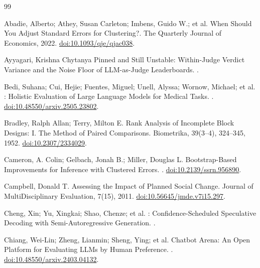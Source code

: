 \begin{thebibliography}{99}
\small

Abadie, Alberto; Athey, Susan Carleton; Imbens, Guido W.; et al.
\newblock When Should You Adjust Standard Errors for Clustering?.
\newblock The Quarterly Journal of Economics, 2022. \href{https://doi.org/10.1093/qje/qjac038}{doi:10.1093/qje/qjac038}.

Ayyagari, Krishna Chytanya
\newblock Pinned and Still Unstable: Within-Judge Verdict Variance and the Noise Floor of {LLM}-as-Judge Leaderboards.
.

Bedi, Suhana; Cui, Hejie; Fuentes, Miguel; Unell, Alyssa; Wornow, Michael; et al.
: Holistic Evaluation of Large Language Models for Medical Tasks.
. \href{https://doi.org/10.48550/arxiv.2505.23802}{doi:10.48550/arxiv.2505.23802}.

Bradley, Ralph Allan; Terry, Milton E.
\newblock Rank Analysis of Incomplete Block Designs: {I}. The Method of Paired Comparisons.
\newblock Biometrika, 39(3--4), 324--345, 1952. \href{https://doi.org/10.2307/2334029}{doi:10.2307/2334029}.

Cameron, A. Colin; Gelbach, Jonah B.; Miller, Douglas L.
\newblock Bootstrap-Based Improvements for Inference with Clustered Errors.
. \href{https://doi.org/10.2139/ssrn.956890}{doi:10.2139/ssrn.956890}.

Campbell, Donald T.
\newblock Assessing the Impact of Planned Social Change.
\newblock Journal of MultiDisciplinary Evaluation, 7(15), 2011. \href{https://doi.org/10.56645/jmde.v7i15.297}{doi:10.56645/jmde.v7i15.297}.

Cheng, Xin; Yu, Xingkai; Shao, Chenze; et al.
: Confidence-Scheduled Speculative Decoding with Semi-Autoregressive Generation.
.

Chiang, Wei-Lin; Zheng, Lianmin; Sheng, Ying; et al.
\newblock Chatbot Arena: An Open Platform for Evaluating {LLM}s by Human Preference.
. \href{https://doi.org/10.48550/arxiv.2403.04132}{doi:10.48550/arxiv.2403.04132}.


\end{thebibliography}
